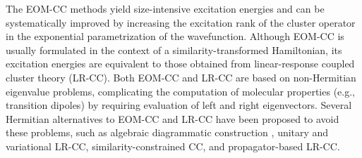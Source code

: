 The EOM-CC methods yield size-intensive excitation energies
\cite{Koch:1990p3345,Koch:1990p3333}
and can be
systematically improved by increasing the excitation rank of the cluster
operator in the exponential parametrization of the wavefunction. Although EOM-CC
is usually formulated in the context of a similarity-transformed Hamiltonian,
its excitation energies are equivalent to those obtained from linear-response
coupled cluster theory (LR-CC).
\cite{Sekino:1984p255,Koch:1990p3345,Koch:1990p3333}
Both EOM-CC and LR-CC are based on non-Hermitian eigenvalue problems,
complicating the computation of molecular properties (e.g., transition dipoles)
by requiring evaluation of left and right eigenvectors.
\cite{Stanton:1993p8840,Stanton:1994p4695,Stanton:1994p8938,Levchenko:2005p224106}
Several Hermitian alternatives to EOM-CC and LR-CC have been
proposed to avoid these problems, such as  
algebraic diagrammatic construction
\cite{Schirmer:1982p2395,Schirmer:1991p4647,Schirmer:2004p11449,Harbach:2014p064113,Dreuw:2014p82}, 
unitary and variational LR-CC,
\cite{Taube:2006p3393,Kats:2011p062503,Walz:2012p052519}
similarity-constrained CC,
\cite{Kjonstad:2017p4801}
and propagator-based LR-CC.
\cite{Moszynski:2005p1109,Korona:2010p14977}

